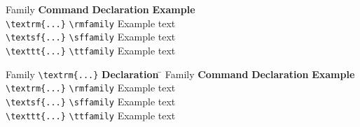 \documentclass{article}
\newcommand{\head}[1]{\textbf{#1}}
\begin{document}
\begin{tabbing}
  Family \= \head{Command} \= \head{Declaration} \= \head{Example}\\
  \> \verb|\textrm{...}| \> \verb|\rmfamily| \> \rmfamily Example text\\
  \> \verb|\textsf{...}| \> \verb|\sffamily| \> \sffamily Example text\\
  \> \verb|\texttt{...}| \> \verb|\ttfamily| \> \ttfamily Example text
\end{tabbing}

\begin{tabbing}
  Family \= \verb|\textrm{...}| \= \head{Declaration} \= \kill 
  Family \> \head{Command} \> \head{Declaration} \> \head{Example}\\
  \> \verb|\textrm{...}| \> \verb|\rmfamily| \> \rmfamily Example text\\
  \> \verb|\textsf{...}| \> \verb|\sffamily| \> \sffamily Example text\\
  \> \verb|\texttt{...}| \> \verb|\ttfamily| \> \ttfamily Example text
\end{tabbing}
\end{document}
